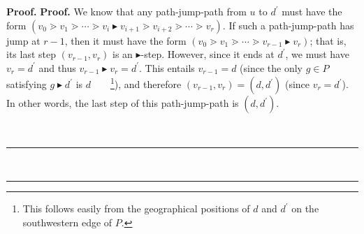 \documentclass[numbers=enddot,12pt,final,onecolumn,notitlepage]{scrartcl}%
\theoremstyle{definition}
\newenvironment{vershort}{}{}
\newenvironment{proof}[1][Proof]{\noindent\textbf{#1.} }{\ \rule{0.5em}{0.5em}}
\begin{document}
\begin{proof}
\begin{proof}
\begin{vershort}
We know that any path-jump-path from $u$ to $d^{\prime}$ must have the form
\newline$\left(  v_{0}\gtrdot v_{1}\gtrdot\cdots\gtrdot v_{i}%
\blacktriangleright v_{i+1}\gtrdot v_{i+2}\gtrdot\cdots\gtrdot v_{r}\right)
$. If such a path-jump-path has jump at $r-1$, then it must have the form
$\left(  v_{0}\gtrdot v_{1}\gtrdot\cdots\gtrdot v_{r-1}\blacktriangleright
v_{r}\right)  $; that is, its last step $\left(  v_{r-1},v_{r}\right)  $ is an
$\blacktriangleright$-step. However, since it ends at $d^{\prime}$, we must
have $v_{r}=d^{\prime}$ and thus $v_{r-1}\blacktriangleright v_{r}=d^{\prime}%
$. This entails $v_{r-1}=d$ (since the only $g\in P$ satisfying
$g\blacktriangleright d^{\prime}$ is $d$\ \ \ \ \footnote{This follows easily
from the geographical positions of $d$ and $d^{\prime}$ on the southwestern
edge of $P$.}), and therefore $\left(  v_{r-1},v_{r}\right)  =\left(
d,d^{\prime}\right)  $ (since $v_{r}=d^{\prime}$). In other words, the last
step of this path-jump-path is $\left(  d,d^{\prime}\right)  $.
\end{vershort}


\end{proof}
\end{proof}
\end{document}
